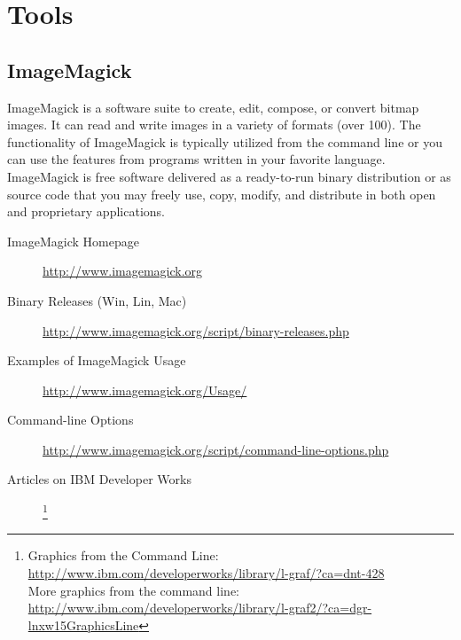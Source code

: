 



\section{Tools}

\subsection{ImageMagick}

ImageMagick is  a software suite to  create, edit, compose,  or convert bitmap
images. It can read  and write images in a variety of  formats (over 100). The
functionality of  ImageMagick is typically  utilized from the command  line or
you   can  use   the  features   from  programs   written  in   your  favorite
language.  ImageMagick is  free software  delivered as  a  ready-to-run binary
distribution or  as source  code that  you may freely  use, copy,  modify, and
distribute in both open and proprietary applications.

\begin{description}
\item[ImageMagick Homepage] \url{http://www.imagemagick.org}
\item[Binary Releases (Win, Lin, Mac)] \url{http://www.imagemagick.org/script/binary-releases.php}
\item[Examples of ImageMagick Usage] \url{http://www.imagemagick.org/Usage/}
\item[Command-line Options] \url{http://www.imagemagick.org/script/command-line-options.php}
\item[Articles on IBM Developer Works]\footnote{Graphics from the Command Line: \url{http://www.ibm.com/developerworks/library/l-graf/?ca=dnt-428}\\
More graphics from the command line: \url{http://www.ibm.com/developerworks/library/l-graf2/?ca=dgr-lnxw15GraphicsLine}
}
\end{description}


